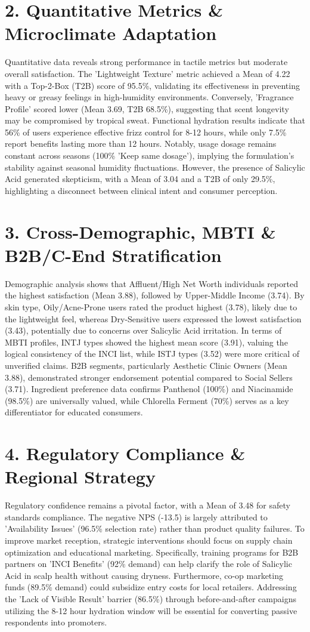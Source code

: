 \documentclass[10pt,twocolumn,a4paper]{article}
\begin{document}
\section{2. Quantitative Metrics \& Microclimate Adaptation}
Quantitative data reveals strong performance in tactile metrics but moderate overall satisfaction. The 'Lightweight Texture' metric achieved a Mean of 4.22 with a Top-2-Box (T2B) score of 95.5\%, validating its effectiveness in preventing heavy or greasy feelings in high-humidity environments. Conversely, 'Fragrance Profile' scored lower (Mean 3.69, T2B 68.5\%), suggesting that scent longevity may be compromised by tropical sweat. Functional hydration results indicate that 56\% of users experience effective frizz control for 8-12 hours, while only 7.5\% report benefits lasting more than 12 hours. Notably, usage dosage remains constant across seasons (100\% 'Keep same dosage'), implying the formulation's stability against seasonal humidity fluctuations. However, the presence of Salicylic Acid generated skepticism, with a Mean of 3.04 and a T2B of only 29.5\%, highlighting a disconnect between clinical intent and consumer perception.
\section{3. Cross-Demographic, MBTI \& B2B/C-End Stratification}
Demographic analysis shows that Affluent/High Net Worth individuals reported the highest satisfaction (Mean 3.88), followed by Upper-Middle Income (3.74). By skin type, Oily/Acne-Prone users rated the product highest (3.78), likely due to the lightweight feel, whereas Dry-Sensitive users expressed the lowest satisfaction (3.43), potentially due to concerns over Salicylic Acid irritation. In terms of MBTI profiles, INTJ types showed the highest mean score (3.91), valuing the logical consistency of the INCI list, while ISTJ types (3.52) were more critical of unverified claims. B2B segments, particularly Aesthetic Clinic Owners (Mean 3.88), demonstrated stronger endorsement potential compared to Social Sellers (3.71). Ingredient preference data confirms Panthenol (100\%) and Niacinamide (98.5\%) are universally valued, while Chlorella Ferment (70\%) serves as a key differentiator for educated consumers.
\section{4. Regulatory Compliance \& Regional Strategy}
Regulatory confidence remains a pivotal factor, with a Mean of 3.48 for safety standards compliance. The negative NPS (-13.5) is largely attributed to 'Availability Issues' (96.5\% selection rate) rather than product quality failures. To improve market reception, strategic interventions should focus on supply chain optimization and educational marketing. Specifically, training programs for B2B partners on 'INCI Benefits' (92\% demand) can help clarify the role of Salicylic Acid in scalp health without causing dryness. Furthermore, co-op marketing funds (89.5\% demand) could subsidize entry costs for local retailers. Addressing the 'Lack of Visible Result' barrier (86.5\%) through before-and-after campaigns utilizing the 8-12 hour hydration window will be essential for converting passive respondents into promoters.
\end{document}
